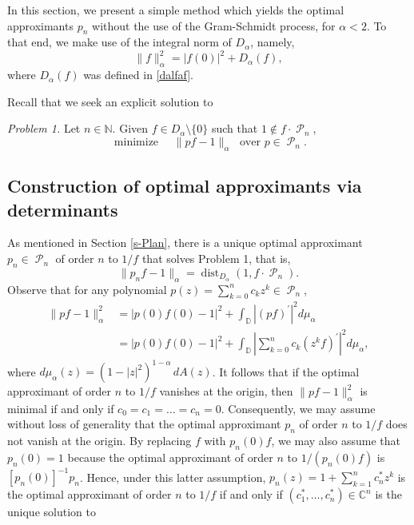 \documentclass[11 pt,reqno]{amsart}
\theoremstyle{definition}
\theoremstyle{remark}
\numberwithin{equation}{section} \numberwithin{figure}{section}
\newcommand{\CC}{{\mathbb C}}
\newcommand{\DD}{{\mathbb D}}
\newcommand{\NN}{{\mathbb N}}
\DeclareMathOperator{\Pol}{{\mathcal P}}
\DeclareMathOperator{\dist}{dist}
\begin{document}
In this section, we present a simple method which yields the optimal approximants
$p_n$ without the use of the Gram-Schmidt process, for $\alpha <2$. To that end,
we make use of the integral norm of $D_{\alpha}$, namely,
\[  \|f\|_{\alpha}^{2}=|f(0)|^{2}+D_{\alpha}(f),    \]
where $D_\alpha(f)$ was defined in \eqref{dalfaf}.

Recall that we seek an explicit solution to

\emph{Problem 1.}  Let $n\in\NN$.  Given $f\in D_{\alpha}\setminus\{0\}$ such that
$1\notin f\cdot\Pol_{n}$,
\[  \text{ minimize }\quad\|p f-1\|_{\alpha}\;\text{ over }p\in\Pol_{n}.    \]

\subsection{Construction of optimal approximants via determinants}

As mentioned in Section \ref{s-Plan}, there is a unique optimal approximant $p_{n}\in\Pol_{n}$
of order $n$ to $1/f$ that solves Problem 1, that is,
\[  \|p_{n}f-1\|_{\alpha}=\dist_{D_{\alpha}}(1,f\cdot\Pol_{n}). \]
Observe that for any polynomial $p(z) =\sum_{k=0}^{n}c_{k}z^{k}\in\Pol_{n}$,
\begin{align*}
      \|pf-1\|_{\alpha}^{2}
      &=|p(0)f(0)-1|^{2}+\int_{\DD}|(pf)^{\prime}|^{2}d\mu_{\alpha}\\
      &=|p(0)f(0)-1|^{2}+\int_{\DD}\left|\sum_{k=0}^{n}c_{k}(z^{k}f)^{\prime}\right|^{2}
      d\mu_{\alpha},
\end{align*}
where $d\mu_{\alpha}(z)=(1-|z|^{2})^{1-\alpha}\, dA(z)$.
It follows that if the optimal approximant of order $n$ to $1/f$ vanishes at the origin,
then $\|pf-1\|_{\alpha}^{2}$ is minimal if and only if $c_{0}=c_{1}=\ldots=c_{n}=0$.
Consequently, we may assume without loss of generality that the optimal approximant
$p_{n}$ of order $n$ to $1/f$ does not vanish at the origin.  By replacing $f$ with
$p_{n}(0)f$, we may also assume that $p_{n}(0)=1$ because the optimal approximant
of order $n$ to $1/(p_{n}(0)f)$ is $[p_{n}(0)]^{-1}p_{n}$.  Hence, under this latter
assumption, $p_{n}(z) =1+\sum_{k=1}^{n}c_{n}^{*}z^{k}$ is the optimal approximant of
order $n$ to $1/f$ if and only if $(c_1^{*},\ldots,c_n^{*})\in\CC^{n}$ is the unique
solution to
\end{document}
